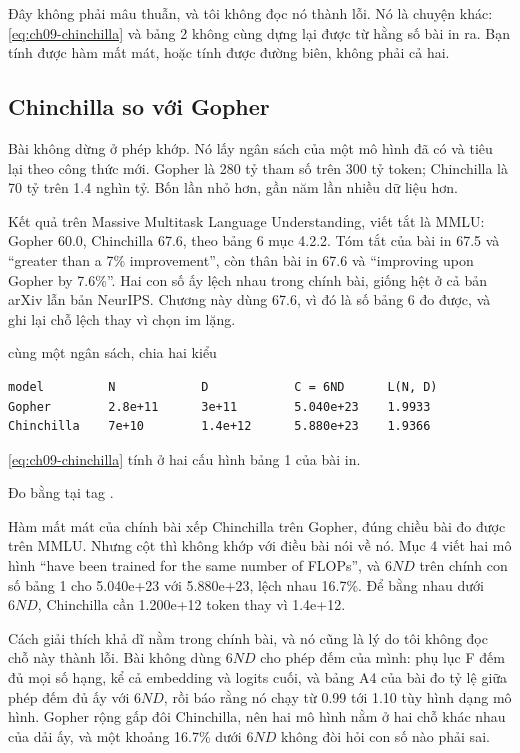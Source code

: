 Đây không phải mâu thuẫn, và tôi không đọc nó thành lỗi. Nó là chuyện khác:
\eqref{eq:ch09-chinchilla} và bảng 2 không cùng dựng lại được từ hằng số bài in
ra. Bạn tính được hàm mất mát, hoặc tính được đường biên, không phải cả hai.

\subsection*{Chinchilla so với Gopher}

%
Bài không dừng ở phép khớp. Nó lấy ngân sách của một mô hình đã có và tiêu lại
theo công thức mới. Gopher là 280 tỷ tham số trên 300 tỷ token; Chinchilla là 70
tỷ trên 1.4 nghìn tỷ. Bốn lần nhỏ hơn, gần năm lần nhiều dữ liệu hơn.

Kết quả trên Massive Multitask Language Understanding, viết tắt là MMLU: Gopher
60.0, Chinchilla 67.6, theo bảng 6 mục 4.2.2. Tóm tắt
của bài in 67.5 và \enquote{greater than a 7\% improvement}, còn thân bài in
67.6 và \enquote{improving upon Gopher by 7.6\%}. Hai con số ấy lệch nhau trong
chính bài, giống hệt ở cả bản arXiv lẫn bản NeurIPS. Chương này dùng 67.6, vì đó
là số bảng 6 đo được, và ghi lại chỗ lệch thay vì chọn im lặng.

\begin{measured}{cùng một ngân sách, chia hai kiểu}
\begin{verbatim}
model         N            D            C = 6ND      L(N, D)
Gopher        2.8e+11      3e+11        5.040e+23    1.9933
Chinchilla    7e+10        1.4e+12      5.880e+23    1.9366
\end{verbatim}

\eqref{eq:ch09-chinchilla} tính ở hai cấu hình bảng 1 của bài in.

Đo bằng  tại tag .
\end{measured}

Hàm mất mát của chính bài xếp Chinchilla trên Gopher, đúng chiều bài đo được
trên MMLU. Nhưng cột  thì không khớp với điều bài nói về nó. Mục 4 viết
hai mô hình \enquote{have been trained for the same number of FLOPs}, và
\(6ND\) trên chính con số bảng 1 cho 5.040e+23 với 5.880e+23, lệch nhau 16.7\%.
Để bằng nhau dưới \(6ND\), Chinchilla cần 1.200e+12 token thay vì 1.4e+12.

Cách giải thích khả dĩ nằm trong chính bài, và nó cũng là lý do tôi không đọc
chỗ này thành lỗi. Bài không dùng \(6ND\) cho phép đếm của mình: phụ lục F đếm
đủ mọi số hạng, kể cả embedding và logits cuối, và bảng A4 của bài đo tỷ lệ
giữa phép đếm đủ ấy với \(6ND\), rồi báo rằng nó chạy từ 0.99 tới 1.10 tùy hình
dạng mô hình. Gopher rộng gấp đôi Chinchilla, nên hai mô hình nằm ở hai chỗ khác
nhau của dải ấy, và một khoảng 16.7\% dưới \(6ND\) không đòi hỏi con số nào
phải sai.

